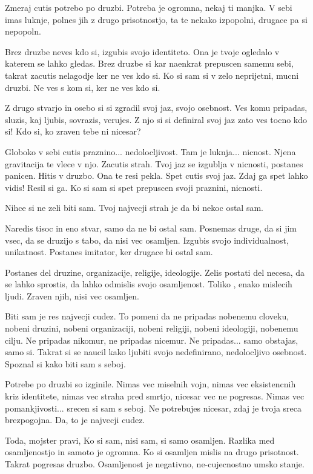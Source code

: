         

   Zmeraj cutis potrebo po druzbi. Potreba je ogromna, nekaj ti manjka. V sebi imas luknje, polnes jih z drugo prisotnostjo, ta te nekako izpopolni, drugace pa si nepopoln. 

Brez druzbe neves kdo si, izgubis svojo identiteto. Ona je tvoje ogledalo v katerem se lahko gledas. Brez druzbe si kar naenkrat prepuscen samemu sebi, takrat zacutis nelagodje ker ne ves kdo si. Ko si sam si v zelo neprijetni, mucni druzbi. Ne ves s kom si, ker ne ves kdo si. 

Z drugo stvarjo in osebo si si zgradil svoj jaz, svojo osebnost. Ves komu pripadas, sluzis, kaj ljubis, sovrazis, verujes. Z njo si si definiral svoj jaz zato ves tocno kdo si! Kdo si, ko zraven tebe ni nicesar? 

Globoko v sebi cutis praznino... nedolocljivost. Tam je luknja... nicnost. Njena gravitacija te vlece v njo. Zacutis strah. Tvoj jaz se izgublja v nicnosti, postanes panicen. Hitis v druzbo. Ona te resi pekla. Spet cutis svoj jaz. Zdaj ga spet lahko vidis! Resil si ga. Ko si sam si spet prepuscen svoji praznini, nicnosti. 

Nihce si ne zeli biti sam. Tvoj najvecji strah je da bi nekoc ostal sam. 

Naredis tisoc in eno stvar, samo da ne bi ostal sam. Posnemas druge, da si jim vsec, da se druzijo s tabo, da nisi vec osamljen. Izgubis svojo individualnost, unikatnost. Postanes imitator, ker drugace bi ostal sam. 

Postanes del druzine, organizacije, religije, ideologije. Zelis postati del necesa, da se lahko sprostis, da lahko odmislis svojo osamljenost. Toliko , enako mislecih ljudi. Zraven njih, nisi vec osamljen. 

Biti sam je res najvecji cudez. To pomeni da ne pripadas nobenemu cloveku, nobeni druzini, nobeni organizaciji, nobeni religiji, nobeni ideologiji, nobenemu cilju. Ne pripadas nikomur, ne pripadas nicemur. Ne pripadas... samo obstajas, samo si. Takrat si se naucil kako ljubiti svojo nedefinirano, nedolocljivo osebnost. Spoznal si kako biti sam s seboj. 

Potrebe po druzbi so izginile. Nimas vec miselnih vojn, nimas vec eksistencnih kriz identitete, nimas vec straha pred smrtjo, nicesar vec ne pogresas. Nimas vec pomankjivosti... srecen si sam s seboj. Ne potrebujes nicesar, zdaj je tvoja sreca brezpogojna. Da, to je najvecji cudez. 

Toda, mojster pravi,  Ko si sam, nisi sam, si samo osamljen. Razlika med osamljenostjo in samoto je ogromna. Ko si osamljen mislis na drugo prisotnost. Takrat pogresas druzbo. Osamljenost je negativno, ne-cujecnostno umsko stanje. 

